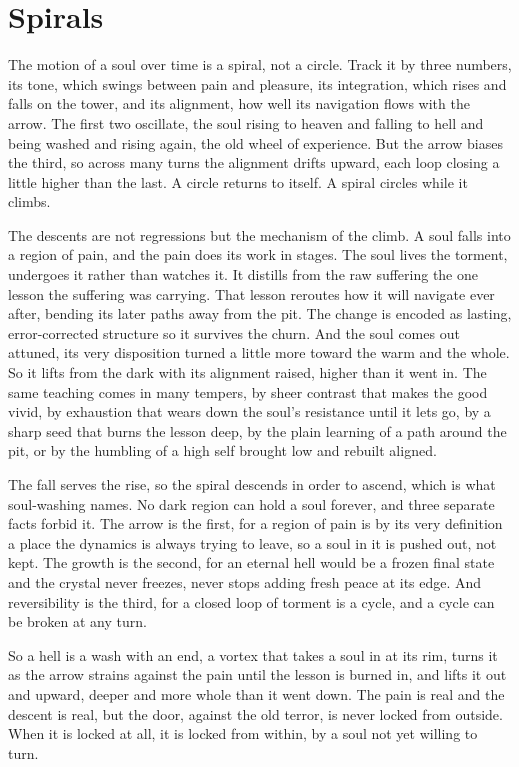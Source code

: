 \section{Spirals}

The motion of a soul over time is a spiral, not a circle. Track it by three numbers, its tone, which swings between pain and pleasure, its integration, which rises and falls on the tower, and its alignment, how well its navigation flows with the arrow. The first two oscillate, the soul rising to heaven and falling to hell and being washed and rising again, the old wheel of experience. But the arrow biases the third, so across many turns the alignment drifts upward, each loop closing a little higher than the last. A circle returns to itself. A spiral circles while it climbs.

The descents are not regressions but the mechanism of the climb. A soul falls into a region of pain, and the pain does its work in stages. The soul lives the torment, undergoes it rather than watches it. It distills from the raw suffering the one lesson the suffering was carrying. That lesson reroutes how it will navigate ever after, bending its later paths away from the pit. The change is encoded as lasting, error-corrected structure so it survives the churn. And the soul comes out attuned, its very disposition turned a little more toward the warm and the whole. So it lifts from the dark with its alignment raised, higher than it went in. The same teaching comes in many tempers, by sheer contrast that makes the good vivid, by exhaustion that wears down the soul's resistance until it lets go, by a sharp seed that burns the lesson deep, by the plain learning of a path around the pit, or by the humbling of a high self brought low and rebuilt aligned.

The fall serves the rise, so the spiral descends in order to ascend, which is what soul-washing names. No dark region can hold a soul forever, and three separate facts forbid it. The arrow is the first, for a region of pain is by its very definition a place the dynamics is always trying to leave, so a soul in it is pushed out, not kept. The growth is the second, for an eternal hell would be a frozen final state and the crystal never freezes, never stops adding fresh peace at its edge. And reversibility is the third, for a closed loop of torment is a cycle, and a cycle can be broken at any turn.

So a hell is a wash with an end, a vortex that takes a soul in at its rim, turns it as the arrow strains against the pain until the lesson is burned in, and lifts it out and upward, deeper and more whole than it went down. The pain is real and the descent is real, but the door, against the old terror, is never locked from outside. When it is locked at all, it is locked from within, by a soul not yet willing to turn.

